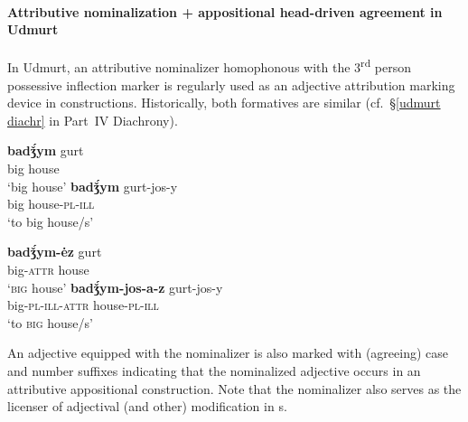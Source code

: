 \paragraph*{Attributive nominalization + appositional head\hyp{}driven agreement in Udmurt}
\label{udmurt synchr}
In Udmurt, an attributive nominalizer homophonous with the 3\textsuperscript{rd} person possessive inflection marker is regularly used as an adjective attribution marking device in  constructions. Historically, both formatives are similar (cf.~\S\ref{udmurt diachr} in Part~IV Diachrony).
\begin{exe}
\begin{xlist}
\begin{xlist}
\ex
\gll	\textbf{badǯ́ym} gurt\\
	big house\\
\glt	‘big house’
\ex	
\gll	\textbf{badǯ́ym} gurt-jos-y\\
	big house-\textsc{pl}-\textsc{ill}\\
\glt	‘to big house/s’
\end{xlist}
\begin{xlist}
\ex
\gll	\textbf{badǯ́ym-ėz} gurt\\
	big-\textsc{attr} house\\
\glt	‘\textsc{big} house’
\ex	
\gll	\textbf{badǯ́ym-jos-a-z} gurt-jos-y\\
	big-\textsc{pl}-\textsc{ill}-\textsc{attr} house-\textsc{pl}-\textsc{ill}\\
\glt	‘to \textsc{big} house/s’
\end{xlist}
\end{xlist}
\end{exe}
An adjective equipped with the nominalizer is also marked with (agreeing) case and number suffixes indicating that the nominalized adjective occurs in an attributive appositional construction. Note that the nominalizer also serves as the licenser of adjectival (and other) modification in s.
